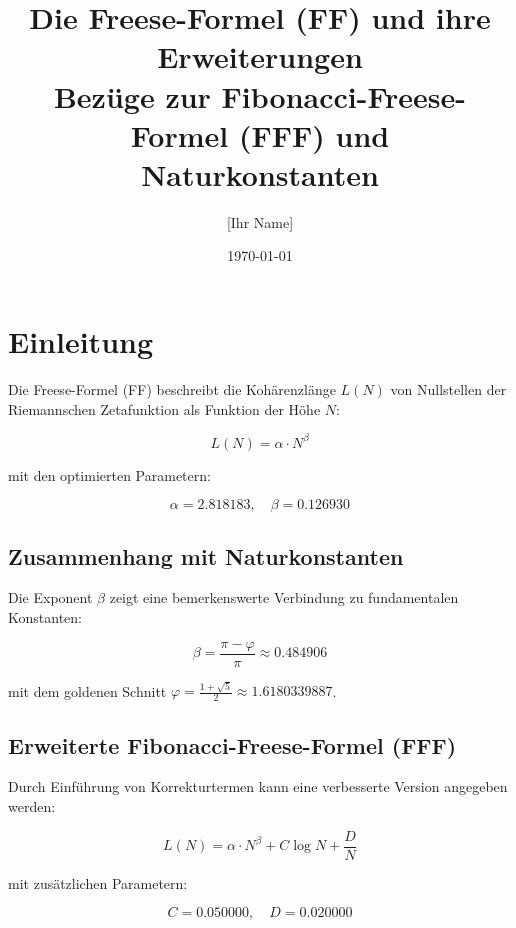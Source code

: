 \documentclass{article}
\title{Die Freese-Formel (FF) und ihre Erweiterungen\\
Bezüge zur Fibonacci-Freese-Formel (FFF) und Naturkonstanten}
\author{[Ihr Name]}
\date{\today}
\begin{document}
\maketitle

\section{Einleitung}
Die Freese-Formel (FF) beschreibt die Kohärenzlänge \( L(N) \) von Nullstellen der Riemannschen Zetafunktion als Funktion der Höhe \( N \):

\begin{equation}
L(N) = \alpha \cdot N^\beta
\end{equation}

mit den optimierten Parametern:

\begin{equation}
\alpha = 2.818183, \quad \beta = 0.126930
\end{equation}

\subsection{Zusammenhang mit Naturkonstanten}
Die Exponent \( \beta \) zeigt eine bemerkenswerte Verbindung zu fundamentalen Konstanten:

\begin{equation}
\beta = \frac{\pi - \varphi}{\pi} \approx 0.484906
\end{equation}

mit dem goldenen Schnitt \( \varphi = \frac{1+\sqrt{5}}{2} \approx 1.6180339887 \).

\subsection{Erweiterte Fibonacci-Freese-Formel (FFF)}
Durch Einführung von Korrekturtermen kann eine verbesserte Version angegeben werden:

\begin{equation}
L(N) = \alpha \cdot N^\beta + C \log N + \frac{D}{N}
\end{equation}

mit zusätzlichen Parametern:

\begin{equation}
C = 0.050000, \quad D = 0.020000
\end{equation}
\end{document}
